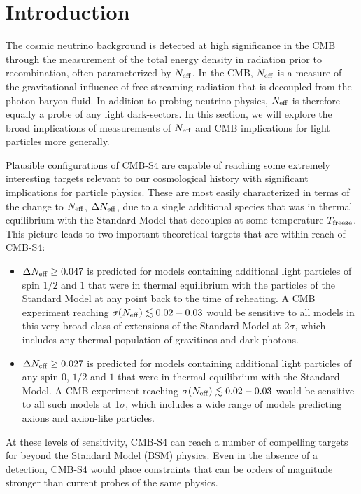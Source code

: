\section{Introduction}



The cosmic neutrino background is detected at high significance in the CMB through the measurement of the total energy density in radiation prior to recombination, often parameterized by $N_{\rm eff}$.  In the CMB, $N_{\rm eff}$ is a measure of the gravitational influence of free streaming radiation that is decoupled from the photon-baryon fluid.  In addition to probing neutrino physics, $N_{\rm eff}$ is therefore equally a probe of any light dark-sectors.  In this section, we will explore the broad implications of measurements of $N_{\rm eff}$ and CMB implications for light particles more generally.

Plausible configurations of CMB-S4 are capable of reaching some extremely interesting targets relevant to our cosmological history with significant implications for particle physics. These are most easily characterized in terms of the change to $N_{\rm eff}$, $\Delta N_{\rm eff}$, due to a single additional species that was in thermal equilibrium with the Standard Model that decouples at some temperature $T_{\rm freeze}$.  This picture leads to two important theoretical targets that are within reach of CMB-S4:
\begin{itemize}
\item $\Delta N_{\rm eff} \geq 0.047$ is predicted for models containing additional light particles of spin $1/2$ and $1$ that were in thermal equilibrium with the particles of the Standard Model at any point back to the time of reheating.  A CMB experiment reaching $\sigma(N_{\rm eff}) \lesssim 0.02-0.03$ would be sensitive to all models in this very broad class of extensions of the Standard Model at 2$\sigma$, which includes any thermal population of gravitinos and dark photons.  %
\item $\Delta N_{\rm eff} \geq  0.027$ is predicted for models containing additional light particles of any spin $0$, $1/2$ and $1$ that were in thermal equilibrium with the Standard Model.  A CMB experiment reaching $\sigma(N_{\rm eff}) \lesssim 0.02-0.03$ would be sensitive to all such models at 1$\sigma$, which includes a wide range of models predicting axions and axion-like particles. 
\end{itemize}
At these levels of sensitivity, CMB-S4 can reach a number of compelling targets for beyond the Standard Model (BSM) physics.  Even in the absence of a detection, CMB-S4 would place constraints that can be orders of magnitude stronger than current probes of the same physics.

